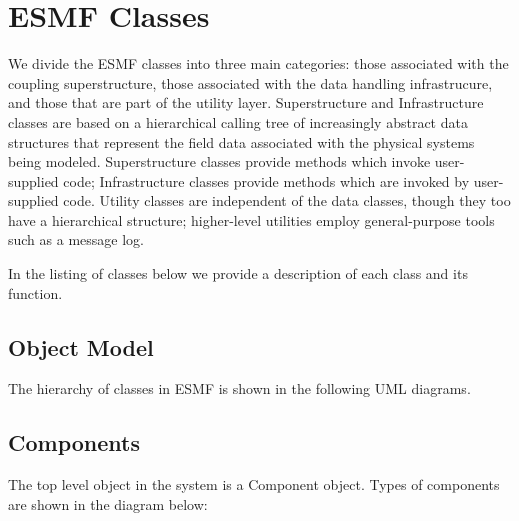 \section{ESMF Classes}

We divide the ESMF classes into three main categories: those associated 
with the coupling superstructure, those associated with the data handling
infrastrucure, and those that are part of the utility layer.  
Superstructure and Infrastructure
classes are based on a hierarchical 
calling tree of increasingly abstract data structures that represent the field data associated 
with the physical systems being modeled.  
Superstructure classes provide methods which invoke user-supplied code;
Infrastructure classes provide methods which are invoked by
user-supplied code.
Utility classes are independent 
of the data classes, though they too have a hierarchical structure; 
higher-level utilities employ general-purpose tools such as a message log.

In the listing of classes below we provide a description of each class and its function.

\subsection{Object Model}

The hierarchy of classes in ESMF is shown in the following UML diagrams.  

\subsection{Components}

The top level object in the system is a Component object.
Types of components are shown in the diagram below:


